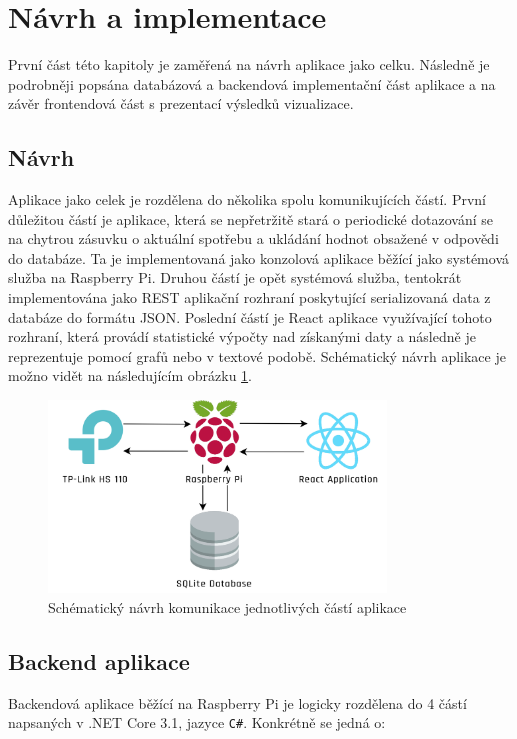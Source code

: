 \documentclass[czech,master,dept460,male,cpp,cpdeclaration,oneside]{diploma}
\begin{document}
\clearpage

\section{Návrh a implementace}
První část této kapitoly je zaměřená na návrh aplikace jako celku. Následně je podrobněji popsána databázová a backendová implementační část aplikace a na závěr frontendová část s prezentací výsledků vizualizace.

\subsection{Návrh}
Aplikace jako celek je rozdělena do několika spolu komunikujících částí. První důležitou částí je aplikace, která se nepřetržitě stará o periodické dotazování se na chytrou zásuvku o aktuální spotřebu a ukládání hodnot obsažené v odpovědi do databáze. Ta je implementovaná jako konzolová aplikace běžící jako systémová služba na Raspberry Pi. Druhou částí je opět systémová služba, tentokrát implementována jako REST aplikační rozhraní poskytující serializovaná data z databáze do formátu JSON. Poslední částí je React aplikace využívající tohoto rozhraní, která provádí statistické výpočty nad získanými daty a následně je reprezentuje pomocí grafů nebo v textové podobě. Schématický návrh aplikace je možno vidět na následujícím obrázku \ref{fig:AppDesign}.

\bigbreak

\begin{figure}[h!]
	\centering
	\includegraphics[width=0.8\textwidth]{Figures/AppDesign.png}
	\caption{Schématický návrh komunikace jednotlivých částí aplikace}
	\label{fig:AppDesign}
\end{figure}

\clearpage

\subsection{Backend aplikace}
Backendová aplikace běžící na Raspberry Pi je logicky rozdělena do 4 částí napsaných v .NET Core 3.1, jazyce \texttt{C\#}. Konkrétně se jedná o:
\end{document}
